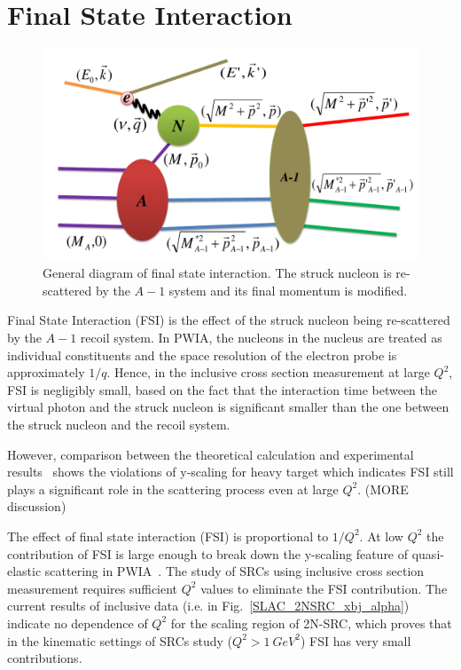 \section{Final State Interaction}
\begin{figure}[!ht]
  \begin{center}
    \includegraphics[type=pdf,ext=.pdf,read=.pdf,width=0.80\linewidth]{./figures/physics/FSI}
    \caption[Final state interaction]{\footnotesize{General diagram of final state interaction. The struck nucleon is re-scattered by the $A-1$ system and its final momentum is modified.}}
    \label{fsi}
  \end{center}
\end{figure}
Final State Interaction (FSI) is the effect of the struck nucleon being re-scattered by the $A-1$ recoil system. In PWIA, the nucleons in the nucleus are treated as individual constituents and the space resolution of the electron probe is approximately $1/q$. Hence, in the inclusive cross section measurement at large $Q^{2}$, FSI is negligibly small, based on the fact that the interaction time between the virtual photon and the struck nucleon is significant smaller than the one between the struck nucleon and the recoil system.

However, comparison between the theoretical calculation and experimental results~\cite{PhysRevC.46.1045,PhysRevC.87.024606} shows the violations of y-scaling for heavy target which indicates FSI still plays a significant role in the scattering process even at large $Q^{2}$.
(MORE discussion)

The effect of final state interaction (FSI) is proportional to $1/Q^{2}$. At low $Q^{2}$ the contribution of FSI is large enough to break down the y-scaling feature of quasi-elastic scattering in PWIA~\cite{Day:1987az}. The study of SRCs using inclusive cross section measurement requires sufficient $Q^{2}$ values to eliminate the FSI contribution. The current results of inclusive data (i.e. in Fig.~\ref{SLAC_2NSRC_xbj_alpha}) indicate no dependence of $Q^{2}$ for the scaling region of 2N-SRC, which proves that in the kinematic settings of SRCs study ($Q^{2}>1~GeV^{2}$) FSI has very small contributions.

